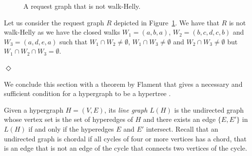 \documentclass[11pt]{article}%
\begin{document}
    \begin{example}\label{ex:not-walk-helly}
 
    \begin{figure}[!ht]
      \centering
\caption{A request graph that is not walk-Helly.}
\label{fig:not-walk-helly}
    \end{figure} 
    Let us consider the request graph $R$ depicted in Figure~\ref{fig:not-walk-helly}. We have that $R$ is not walk-Helly as we have the closed walks $W_1=(a,b,a)$, $W_2=(b,c,d,c,b)$ and $W_3=(a,d,e,a)$ such that $W_1\cap W_2\neq \emptyset$, $W_1\cap W_3\neq \emptyset$ and $W_2\cap W_3\neq \emptyset$ but $W_1\cap W_2\cap W_3= \emptyset$. 
    
    \hfill{} $\Diamond$ 
    \end{example}
    
    We conclude this section with a theorem by Flament that gives a necessary and sufficient condition for a hypergraph to be a hypertree \cite{flament1978}.
    
    Given a hypergraph $H=(V,E)$, its {\it line graph} $L(H)$ is the undirected graph whose vertex set is the set of hyperedges of $H$ and there exists an edge $\{E,E'\}$ in $L(H)$ if and only if the hyperedges $E$ and $E'$ intersect. 
    Recall that an undirected graph is chordal if all cycles of four or more vertices has a chord, that is an edge that is not an edge of the cycle that connects two vertices of the cycle.
    
\end{document}
